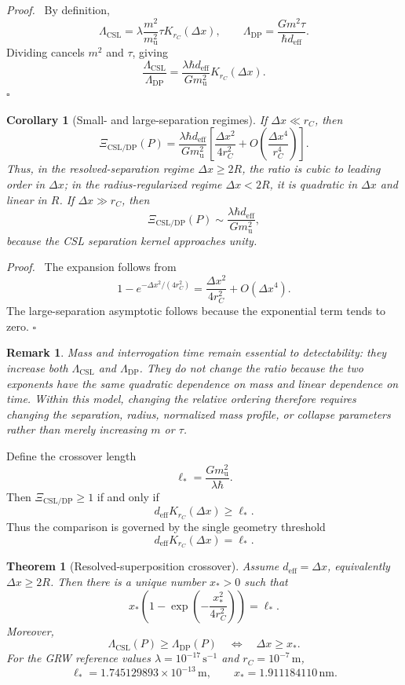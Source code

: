 \documentclass[
  aps,
  prd,
  preprint,
  notitlepage,
  superscriptaddress,
  nofootinbib,
  longbibliography
]{revtex4-2}
\newtheorem{theorem}{Theorem}
\newtheorem{corollary}{Corollary}
\newtheorem{remark}{Remark}
\newenvironment{proof}{\par\noindent\textit{Proof.}\ }{\hfill$\square$\par}
\newcommand{\amu}{m_{\mathrm u}}
\newcommand{\dx}{\Delta x}
\newcommand{\Lcsl}{\Lambda_{\mathrm{CSL}}}
\newcommand{\Ldp}{\Lambda_{\mathrm{DP}}}
\newcommand{\Krc}{K_{r_C}}
\newcommand{\Xic}{\Xi_{\mathrm{CSL/DP}}}
\newcommand{\ellstar}{\ell_*}
\begin{document}
\begin{proof}
By definition,
\[
\Lcsl=\lambda\frac{m^2}{\amu^2}\tau\Krc(\dx),
\qquad
\Ldp=\frac{Gm^2\tau}{\hbar d_{\mathrm{eff}}}.
\]
Dividing cancels $m^2$ and $\tau$, giving
\[
\frac{\Lcsl}{\Ldp}=\frac{\lambda\hbar d_{\mathrm{eff}}}{G\amu^2}\Krc(\dx).
\]
\end{proof}

\begin{corollary}[Small- and large-separation regimes]
If $\dx\ll r_C$, then
\[
\Xic(P)=\frac{\lambda\hbar d_{\mathrm{eff}}}{G\amu^2}
\left[\frac{\dx^2}{4r_C^2}
+O\!\left(\frac{\dx^4}{r_C^4}\right)\right].
\]
Thus, in the resolved-separation regime $\dx\ge2R$, the ratio is cubic to leading order in $\dx$; in the radius-regularized regime $\dx<2R$, it is quadratic in $\dx$ and linear in $R$. If $\dx\gg r_C$, then
\[
\Xic(P)\sim\frac{\lambda\hbar d_{\mathrm{eff}}}{G\amu^2},
\]
because the CSL separation kernel approaches unity.
\end{corollary}

\begin{proof}
The expansion follows from
\[
1-e^{-\dx^2/(4r_C^2)}=\frac{\dx^2}{4r_C^2}+O(\dx^4).
\]
The large-separation asymptotic follows because the exponential term tends to zero.
\end{proof}

\begin{remark}
Mass and interrogation time remain essential to detectability: they increase both $\Lcsl$ and $\Ldp$. They do not change the ratio because the two exponents have the same quadratic dependence on mass and linear dependence on time. Within this model, changing the relative ordering therefore requires changing the separation, radius, normalized mass profile, or collapse parameters rather than merely increasing $m$ or $\tau$.
\end{remark}

Define the crossover length
\[
\ellstar=\frac{G\amu^2}{\lambda\hbar}.
\]
Then $\Xic\ge1$ if and only if
\[
d_{\mathrm{eff}}\Krc(\dx)\ge\ellstar.
\]
Thus the comparison is governed by the single geometry threshold
\[
d_{\mathrm{eff}}\Krc(\dx)=\ellstar.
\]

\begin{theorem}[Resolved-superposition crossover]
Assume $d_{\mathrm{eff}}=\dx$, equivalently $\dx\ge2R$. Then there is a unique number $x_*>0$ such that
\[
x_*\left(1-\exp\!\left(-\frac{x_*^2}{4r_C^2}\right)\right)=\ellstar.
\]
Moreover,
\[
\Lcsl(P)\ge\Ldp(P)\quad\Longleftrightarrow\quad\dx\ge x_*.
\]
For the GRW reference values $\lambda=10^{-17}\,\mathrm{s}^{-1}$ and $r_C=10^{-7}\,\mathrm m$,
\[
\ellstar=1.745129893\times10^{-13}\,\mathrm m,
\qquad
x_*=1.911184110\,\mathrm{nm}.
\]
\end{theorem}
\end{document}
